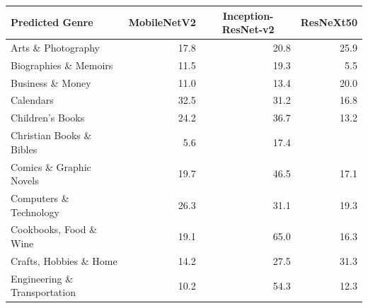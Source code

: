 \documentclass[12pt]{article}
\numberwithin{equation}{section}
\numberwithin{figure}{section}
\begin{document}
\begin{table}[]
	\centering
	\begin{tabular}{lrrr}
	\textbf{Predicted Genre}      & \multicolumn{1}{c}{\textbf{MobileNetV2}} & \multicolumn{1}{c}{\textbf{Inception-ResNet-v2}} & \multicolumn{1}{c}{\textbf{ResNeXt50}} \\ \hline
	Arts \& Photography           & 17.8                                     & 20.8                                            & 25.9                                   \\
	Biographies \& Memoirs        & 11.5                                     & 19.3                                            & 5.5                                    \\
	Business \& Money             & 11.0                                     & 13.4                                            & 20.0                                   \\
	Calendars                     & 32.5                                     & 31.2                                            & 16.8                                   \\
	Children's Books              & 24.2                                     & 36.7                                            & 13.2                                   \\
	Christian Books \& Bibles     & 5.6                                      & 17.4                                            &                                        \\
	Comics \& Graphic Novels      & 19.7                                     & 46.5                                            & 17.1                                   \\
	Computers \& Technology       & 26.3                                     & 31.1                                            & 19.3                                   \\
	Cookbooks, Food \& Wine       & 19.1                                     & 65.0                                            & 16.3                                   \\
	Crafts, Hobbies \& Home       & 14.2                                     & 27.5                                            & 31.3                                   \\
	Engineering \& Transportation & 10.2                                     & 54.3                                            & 12.3                                   \\

\end{tabular}
\end{table}
\end{document}
